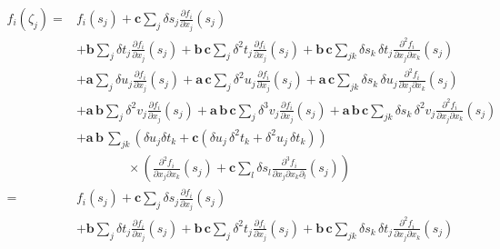 \begin{align*}
f_{i} \! \left( \zeta_{j} \right)
%
=&
f_{i} \! \left( s_{j} \right) + \mathbf{c} \sum_{j} \delta s_{j} 
\frac{ \partial f_{i} }{ \partial x_{j} } \! \left( s_{j} \right)
\\
&+ 
\mathbf{b} \sum_{j} \delta t_{j} \frac{ \partial f_{i} }{ \partial x_{j} } \! \left( s_{j} \right)
+ \mathbf{b} \, \mathbf{c} \sum_{j} \delta^{2} t_{j} 
\frac{ \partial f_{i} }{ \partial x_{j} } \! \left( s_{j} \right) 
+ \mathbf{b} \, \mathbf{c} \sum_{jk} \delta s_{k} \, \delta t_{j} 
\frac{ \partial^{2} f_{i} }{ \partial x_{j} \partial x_{k} } \! \left( s_{j} \right)
\\
&+ 
\mathbf{a} \sum_{j} \delta u_{j} \frac{ \partial f_{i} }{ \partial x_{j} } \! \left( s_{j} \right)
+ \mathbf{a} \, \mathbf{c} \sum_{j} \delta^{2} u_{j} 
\frac{ \partial f_{i} }{ \partial x_{j} } \! \left( s_{j} \right) 
+ \mathbf{a} \, \mathbf{c} \sum_{jk} \delta s_{k} \, \delta u_{j} 
\frac{ \partial^{2} f_{i} }{ \partial x_{j} \partial x_{k} } \! \left( s_{j} \right)
\\
&+ 
\mathbf{a} \, \mathbf{b} \sum_{j} \delta^{2} v_{j} 
\frac{ \partial f_{i} }{ \partial x_{j} } \! \left( s_{j} \right)
+ \mathbf{a} \, \mathbf{b} \, \mathbf{c} \sum_{j} \delta^{3} v_{j} 
\frac{ \partial f_{i} }{ \partial x_{j} } \! \left( s_{j} \right) 
+ \mathbf{a} \, \mathbf{b} \, \mathbf{c} \sum_{jk} \delta s_{k} \, \delta^{2} v_{j} 
\frac{ \partial^{2} f_{i} }{ \partial x_{j} \partial x_{k} } \! \left( s_{j} \right)
\\
&+ 
\mathbf{a} \, \mathbf{b} \, \sum_{jk} 
\left( \delta u_{j} \delta t_{k}
+ \mathbf{c} \left(
\delta u_{j} \, \delta^{2} t_{k} + \delta^{2} u_{j} \, \delta t_{k} 
\right) \right)
\\
& \quad\quad\quad\quad \times \left(
\frac{ \partial^{2} f_{i} }{ \partial x_{j} \partial x_{k} } \! \left( s_{j} \right) 
+ \mathbf{c} \sum_{l} \delta s_{l} 
\frac{ \partial^{3} f_{i} }{ \partial x_{j} \partial x_{k} \partial_{l} } \! \left( s_{j} \right)
\right)
\\
%
=&
f_{i} \! \left( s_{j} \right) + \mathbf{c} \sum_{j} \delta s_{j} 
\frac{ \partial f_{i} }{ \partial x_{j} } \! \left( s_{j} \right)
\\
&+ 
\mathbf{b} \sum_{j} \delta t_{j} \frac{ \partial f_{i} }{ \partial x_{j} } \! \left( s_{j} \right)
+ \mathbf{b} \, \mathbf{c} \sum_{j} \delta^{2} t_{j} 
\frac{ \partial f_{i} }{ \partial x_{j} } \! \left( s_{j} \right) 
+ \mathbf{b} \, \mathbf{c} \sum_{jk} \delta s_{k} \, \delta t_{j} 
\frac{ \partial^{2} f_{i} }{ \partial x_{j} \partial x_{k} } \! \left( s_{j} \right)

\end{align*}
